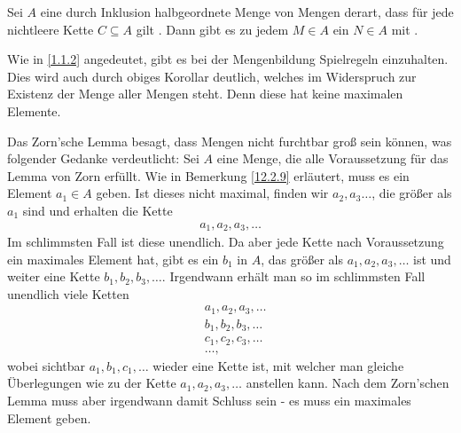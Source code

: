 \documentclass[../../main.tex]{subfiles}
\begin{document}
\begin{kor}\label{12.2.11}
Sei $A$ eine durch Inklusion halbgeordnete Menge von Mengen derart, dass für jede nichtleere Kette $C\subseteq A$ gilt . Dann gibt es zu jedem $M\in A$ ein  $N\in A$ mit .
\end{kor}

\begin{bem}\label{12.2.12}
Wie in \ref{1.1.2} angedeutet, gibt es bei der Mengenbildung Spielregeln einzuhalten. Dies wird auch durch obiges Korollar deutlich, welches im Widerspruch zur Existenz der Menge aller Mengen steht. Denn diese hat keine maximalen Elemente.
\end{bem}

\begin{ans}
Das Zorn'sche Lemma besagt, dass Mengen nicht furchtbar groß sein können, was folgender Gedanke verdeutlicht: Sei $A$ eine Menge, die alle Voraussetzung für das Lemma von Zorn erfüllt. Wie in Bemerkung \ref{12.2.9} erläutert, muss es ein Element $a_1\in A$ geben. Ist dieses nicht maximal, finden wir $a_2,a_3\ldots $, die größer als $a_1$ sind und erhalten die Kette
\begin{align*}
a_1,a_2,a_3,\ldots 
\end{align*}
Im schlimmsten Fall ist diese unendlich. Da aber jede Kette nach Voraussetzung ein maximales Element hat, gibt es ein $b_1$ in $A$, das größer als $a_1,a_2,a_3,\ldots $ ist und weiter eine Kette $b_1,b_2,b_3,\ldots $. Irgendwann erhält man so im schlimmsten Fall unendlich viele Ketten
\begin{align*}
&a_1,a_2,a_3,\ldots \\
&b_1,b_2,b_3,\ldots \\
&c_1,c_2,c_3,\ldots \\
&\ldots ,
\end{align*}
wobei sichtbar $a_1,b_1,c_1,\ldots $ wieder eine Kette ist, mit welcher man gleiche Überlegungen wie zu der Kette $a_1,a_2,a_3,\ldots $ anstellen kann. Nach dem Zorn'schen Lemma muss aber irgendwann damit Schluss sein - es muss ein maximales Element geben.
\end{ans}
\end{document}

